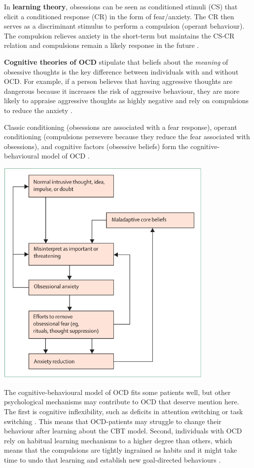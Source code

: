 \documentclass[]{book}
\theoremstyle{definition}
\theoremstyle{definition}
\theoremstyle{definition}
\theoremstyle{remark}
\begin{document}
In \textbf{learning theory}, obsessions can be seen as conditioned
stimuli (CS) that elicit a conditioned response (CR) in the form of
fear/anxiety. The CR then serves as a discriminant stimulus to perform a
compulsion (operant behaviour). The compulsion relieves anxiety in the
short-term but maintains the CS-CR relation and compulsions remain a
likely response in the future \citep{mowrer1960}.

\textbf{Cognitive theories of OCD} stipulate that beliefs about the
\emph{meaning} of obsessive thoughts is the key difference between
individuals with and without OCD. For example, if a person believes that
having aggressive thoughts are dangerous because it increases the risk
of aggressive behaviour, they are more likely to appraise aggressive
thoughts as highly negative and rely on compulsions to reduce the
anxiety \citep{salkovskis1985}.

Classic conditioning (obsessions are associated with a fear response),
operant conditioning (compulsions persevere because they reduce the fear
associated with obsessions), and cognitive factors (obsessive beliefs)
form the cognitive-behavioural model of OCD \citep{abramowitz2009}.

\includegraphics[width=4.16667in,height=\textheight]{images/cbt-model-of-ocd.png}

The cognitive-behavioural model of OCD fits some patients well, but
other psychological mechanisms may contribute to OCD that deserve
mention here. The first is cognitive inflexibility, such as deficits in
attention switching or task switching \citep{gruner2017}. This means
that OCD-patients may struggle to change their behaviour after learning
about the CBT model. Second, individuals with OCD rely on habitual
learning mechanisms to a higher degree than others, which means that the
compulsions are tightly ingrained as habits and it might take time to
undo that learning and establish new goal-directed behaviours
\citep{gillan2014, voon2014}.
\end{document}

